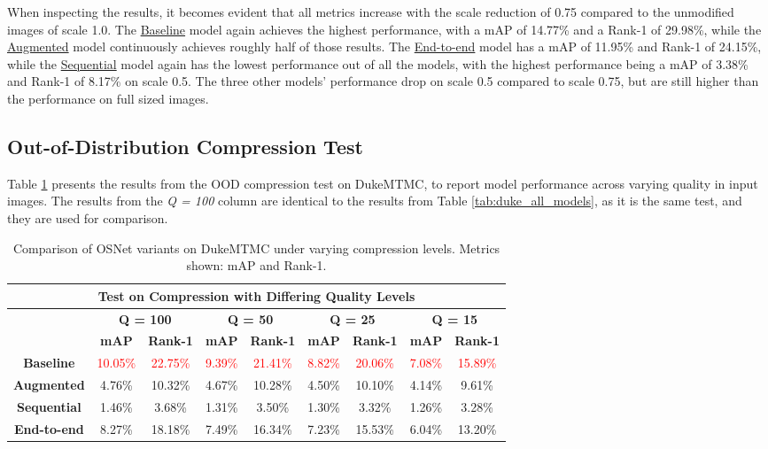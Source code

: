 \noindent When inspecting the results, it becomes evident that all metrics increase with the scale reduction of 0.75 compared to the unmodified images of scale 1.0. The \hyperlink{model:baseline}{Baseline} model again achieves the highest performance, with a \acs{mAP} of 14.77\% and a Rank-1 of 29.98\%, while the \hyperlink{model:augmented}{Augmented} model continuously achieves roughly half of those results. The \hyperlink{model:endtoend}{End-to-end} model has a \acs{mAP} of 11.95\% and Rank-1 of 24.15\%, while the \hyperlink{model:sequential}{Sequential} model again has the lowest performance out of all the models, with the highest performance being a \acs{mAP} of 3.38\% and Rank-1 of 8.17\% on scale 0.5. The three other models' performance drop on scale 0.5 compared to scale 0.75, but are still higher than the performance on full sized images. 


\subsection*{Out-of-Distribution Compression Test}

Table \ref{tab:compression_test_all} presents the results from the \acs{OOD} compression test on \acs{DukeMTMC}, to report model performance across varying quality in input images. The results from the \textit{Q = 100} column are identical to the results from Table \ref{tab:duke_all_models}, as it is the same test, and they are used for comparison. 

\begin{table}[H]
\centering
\small
\renewcommand{\arraystretch}{1.2}
\setlength{\tabcolsep}{6pt}
\begin{tabular}{|c|c|c|c|c|c|c|c|c|}
\hline
\multicolumn{9}{|c|}{\cellcolor[HTML]{D8E9F7}\textbf{Test on Compression with Differing Quality Levels}} \\
\hline
\rowcolor[HTML]{D8E9F7}
& \multicolumn{2}{c|}{\textbf{Q = 100}} 
& \multicolumn{2}{c|}{\textbf{Q = 50}} 
& \multicolumn{2}{c|}{\textbf{Q = 25}} 
& \multicolumn{2}{c|}{\textbf{Q = 15}} \\
\hline
\rowcolor[HTML]{D8E9F7}
& \textbf{\acs{mAP}}& \textbf{Rank-1} 
& \textbf{\acs{mAP}}& \textbf{Rank-1} 
& \textbf{\acs{mAP}}& \textbf{Rank-1} 
& \textbf{\acs{mAP}}& \textbf{Rank-1} \\
\hline
\textbf{Baseline} 
& \textcolor{red}{10.05\%} & \textcolor{red}{22.75\%}
& \textcolor{red}{9.39\%}  & \textcolor{red}{21.41\%}
& \textcolor{red}{8.82\%}  & \textcolor{red}{20.06\%}
& \textcolor{red}{7.08\%}  & \textcolor{red}{15.89\%} \\
\hline
\textbf{Augmented} 
& 4.76\%& 10.32\%& 4.67\%& 10.28\%& 4.50\%& 10.10\%& 4.14\%& 9.61\%\\
\hline
\textbf{Sequential} 
& 1.46\%& 3.68\%& 1.31\%& 3.50\%& 1.30\%& 3.32\%& 1.26\%& 3.28\%\\
\hline
\textbf{End-to-end} 
& 8.27\%& 18.18\%& 7.49\%& 16.34\%& 7.23\%& 15.53\%& 6.04\%& 13.20\%\\
\hline
\end{tabular}
\caption{Comparison of \acs{OSNet} variants on \acs{DukeMTMC} under varying compression levels. Metrics shown: \acs{mAP} and Rank-1.}
\label{tab:compression_test_all}
\end{table}

